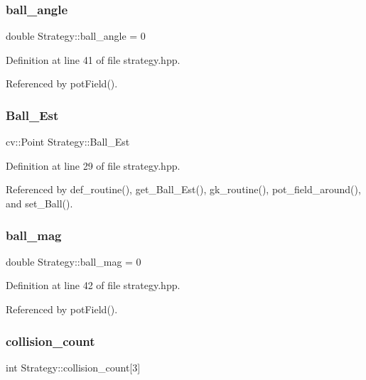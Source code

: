 \subsubsection{\texorpdfstring{ball\+\_\+angle}{ball\_angle}}
{\footnotesize\ttfamily double Strategy\+::ball\+\_\+angle = 0}



Definition at line 41 of file strategy.\+hpp.



Referenced by pot\+Field().

\mbox{\label{class_strategy_ae629b11b862d24dba3fb3322659e439e}} 
\subsubsection{\texorpdfstring{Ball\+\_\+\+Est}{Ball\_Est}}
{\footnotesize\ttfamily cv\+::\+Point Strategy\+::\+Ball\+\_\+\+Est}



Definition at line 29 of file strategy.\+hpp.



Referenced by def\+\_\+routine(), get\+\_\+\+Ball\+\_\+\+Est(), gk\+\_\+routine(), pot\+\_\+field\+\_\+around(), and set\+\_\+\+Ball().

\mbox{\label{class_strategy_a8c03a4d7a8c88b32d19fe3cd99029c02}} 
\subsubsection{\texorpdfstring{ball\+\_\+mag}{ball\_mag}}
{\footnotesize\ttfamily double Strategy\+::ball\+\_\+mag = 0}



Definition at line 42 of file strategy.\+hpp.



Referenced by pot\+Field().

\mbox{\label{class_strategy_a5ca4277b2cb59fbd6732c1ffa91e0760}} 
\subsubsection{\texorpdfstring{collision\+\_\+count}{collision\_count}}
{\footnotesize\ttfamily int Strategy\+::collision\+\_\+count\mbox{[}3\mbox{]}}



